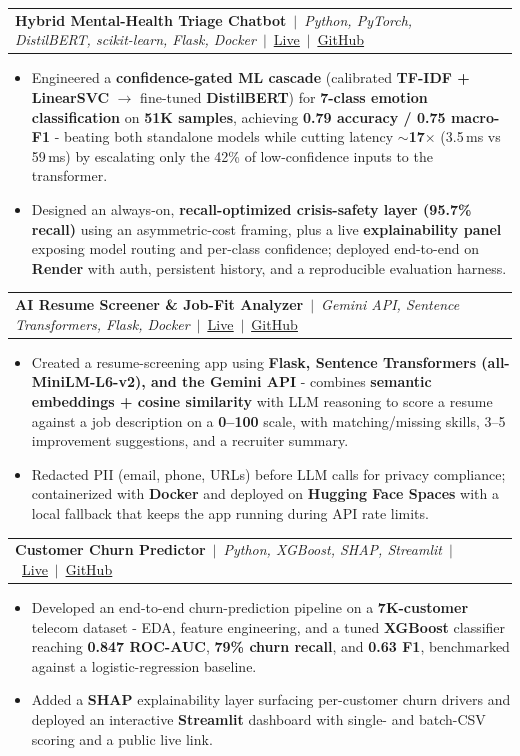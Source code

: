 \documentclass[letterpaper,9pt]{article}
\makeatletter
\newcommand{\resumeItem}[1]{%
  \item\scriptsize{#1}%
}
\newcommand{\resumeProjectHeading}[1]{%
  \vspace{0pt}\item
  \begin{tabular*}{1.0\textwidth}{l@{\extracolsep{\fill}}r}
    \scriptsize #1\\
  \end{tabular*}\vspace{-3pt}%
}
\newcommand{\resumeItemListStart}{\begin{itemize}[leftmargin=0.15in,itemsep=1pt,topsep=1pt,parsep=0pt]}
\newcommand{\resumeItemListEnd}{\end{itemize}\vspace{0pt}}
\makeatother
\begin{document}
  \resumeProjectHeading
    {\textbf{Hybrid Mental-Health Triage Chatbot}~$|$~\emph{Python, PyTorch, DistilBERT, scikit-learn, Flask, Docker}~$|$~\href{https://hybrid-chatbot-o0s2.onrender.com}{\underline{Live}}~$|$~\href{https://github.com/afrin2315/hybrid_chatbot}{\underline{GitHub}}}
  \resumeItemListStart
    \resumeItem{Engineered a \textbf{confidence-gated ML cascade} (calibrated \textbf{TF-IDF + LinearSVC} $\rightarrow$ fine-tuned \textbf{DistilBERT}) for \textbf{7-class emotion classification} on \textbf{51K samples}, achieving \textbf{0.79 accuracy / 0.75 macro-F1} - beating both standalone models while cutting latency \textbf{$\sim$17$\times$} (3.5\,ms vs 59\,ms) by escalating only the 42\% of low-confidence inputs to the transformer.}
    \resumeItem{Designed an always-on, \textbf{recall-optimized crisis-safety layer (95.7\% recall)} using an asymmetric-cost framing, plus a live \textbf{explainability panel} exposing model routing and per-class confidence; deployed end-to-end on \textbf{Render} with auth, persistent history, and a reproducible evaluation harness.}
  \resumeItemListEnd

  \resumeProjectHeading
    {\textbf{AI Resume Screener \& Job-Fit Analyzer}~$|$~\emph{Gemini API, Sentence Transformers, Flask, Docker}~$|$~\href{https://huggingface.co/spaces/Afrin18/ai-resume-screener}{\underline{Live}}~$|$~\href{https://github.com/afrin2315/ai-resume-screener}{\underline{GitHub}}}
  \resumeItemListStart
    \resumeItem{Created a resume-screening app using \textbf{Flask, Sentence Transformers (all-MiniLM-L6-v2), and the Gemini API} - combines \textbf{semantic embeddings + cosine similarity} with LLM reasoning to score a resume against a job description on a \textbf{0--100} scale, with matching/missing skills, 3--5 improvement suggestions, and a recruiter summary.}
    \resumeItem{Redacted PII (email, phone, URLs) before LLM calls for privacy compliance; containerized with \textbf{Docker} and deployed on \textbf{Hugging Face Spaces} with a local fallback that keeps the app running during API rate limits.}
  \resumeItemListEnd

  \resumeProjectHeading
    {\textbf{Customer Churn Predictor}~$|$~\emph{Python, XGBoost, SHAP, Streamlit}~$|$~\href{https://churn-predictor-afrin.streamlit.app}{\underline{Live}}~$|$~\href{https://github.com/afrin2315/churn_predictor}{\underline{GitHub}}}
  \resumeItemListStart
    \resumeItem{Developed an end-to-end churn-prediction pipeline on a \textbf{7K-customer} telecom dataset - EDA, feature engineering, and a tuned \textbf{XGBoost} classifier reaching \textbf{0.847 ROC-AUC}, \textbf{79\% churn recall}, and \textbf{0.63 F1}, benchmarked against a logistic-regression baseline.}
    \resumeItem{Added a \textbf{SHAP} explainability layer surfacing per-customer churn drivers and deployed an interactive \textbf{Streamlit} dashboard with single- and batch-CSV scoring and a public live link.}
  \resumeItemListEnd
\end{document}
